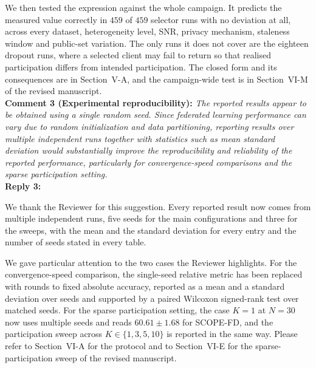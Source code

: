 \documentclass[10pt]{article}
\begin{document}
{We then tested the expression against the whole campaign. It predicts the measured value correctly in $459$ of $459$ selector runs with no deviation at all, across every dataset, heterogeneity level, SNR, privacy mechanism, staleness window and public-set variation. The only runs it does not cover are the eighteen dropout runs, where a selected client may fail to return so that realised participation differs from intended participation. The closed form and its consequences are in Section~V-A, and the campaign-wide test is in Section~VI-M of the revised manuscript.}\\

\noindent
\textbf{Comment 3 (Experimental reproducibility):} \textit{The reported results appear to be obtained using a single random seed. Since federated learning performance can vary due to random initialization and data partitioning, reporting results over multiple independent runs together with statistics such as mean standard deviation would substantially improve the reproducibility and reliability of the reported performance, particularly for convergence-speed comparisons and the sparse participation setting.} \\
\noindent
\textbf{Reply 3:} {We thank the Reviewer for this suggestion. Every reported result now comes from multiple independent runs, five seeds for the main configurations and three for the sweeps, with the mean and the standard deviation for every entry and the number of seeds stated in every table.

We gave particular attention to the two cases the Reviewer highlights. For the convergence-speed comparison, the single-seed relative metric has been replaced with rounds to fixed absolute accuracy, reported as a mean and a standard deviation over seeds and supported by a paired Wilcoxon signed-rank test over matched seeds. For the sparse participation setting, the case $K = 1$ at $N = 30$ now uses multiple seeds and reads $60.61 \pm 1.68$ for SCOPE-FD, and the participation sweep across $K \in \{1, 3, 5, 10\}$ is reported in the same way. Please refer to Section~VI-A for the protocol and to Section~VI-E for the sparse-participation sweep of the revised manuscript.}\\
\end{document}
